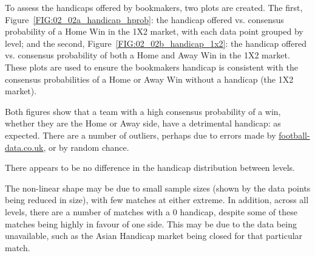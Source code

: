 \documentclass[a4paper,10pt]{report}
\begin{document}
To assess the handicaps offered by bookmakers, two plots are created. The first, Figure~\ref{FIG:02_02a_handicap_hprob}: the handicap offered vs. consensus probability of a Home Win in the 1X2 market, with each data point grouped by level; and the second, Figure~\ref{FIG:02_02b_handicap_1x2}: the handicap offered vs. consensus probability of both a Home and Away Win in the 1X2 market. These plots are used to ensure the bookmakers handicap is consistent with the consensus probabilities of a Home or Away Win without a handicap (the 1X2 market).

Both figures show that a team with a high consensus probability of a win, whether they are the Home or Away side, have a detrimental handicap: as expected. There are a number of outliers, perhaps due to errors made by \url{football-data.co.uk}, or by random chance. %

There appears to be no difference in the handicap distribution between levels.

The non-linear shape may be due to small sample sizes (shown by the data points being reduced in size), with few matches at either extreme. In addition, across all levels, there are a number of matches with a 0 handicap, despite some of these matches being highly in favour of one side. This may be due to the data being unavailable, such as the Asian Handicap market being closed for that particular match.\vspace{3mm}
\end{document}
